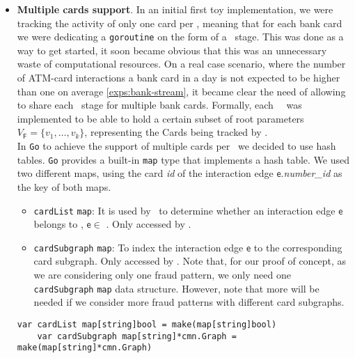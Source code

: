 \begin{itemize}
    \item \textbf{Multiple cards support}. In an initial first toy implementation, we were tracking the activity of only one card per \filter, meaning that for each bank card we were dedicating a \texttt{goroutine} on the form of a \filter\ stage. This was done as a way to get started, it soon became obvious that this was an unnecessary waste of computational resources. On a real case scenario, where the number of ATM-card interactions a bank card in a day is not expected to be higher than one on average \ref{exps:bank-stream}, it became clear the need of allowing to share each \filter\ stage for multiple bank cards. Formally, each \filter\ \F\ was implemented to be able to hold a certain subset of root parameters $V_{\mathsf{F}} = \{v_1,\ldots,v_k\}$, representing the Cards being tracked by \F.\\

    In \texttt{Go} to achieve the support of multiple cards per \filter\ we decided to use hash tables. \texttt{Go} provides a built-in \texttt{map} type that implements a hash table. We used two different maps, using the card \emph{id} of the interaction edge $\mathsf{e}$.\emph{number\_id} as the key of both maps.

    \begin{itemize}
        \item \texttt{cardList} \texttt{map}: It is used by \F\ to determine whether an interaction edge $\mathsf{e}$ belongs to \F, $\mathsf{e} \in$ \F. Only accessed by \F.
        \item \texttt{cardSubgraph} \texttt{map}: To index the interaction edge $\mathsf{e}$ to the corresponding card subgraph.
        Only accessed by \FW. Note that, for our proof of concept, as we are considering only one fraud pattern, we only need one \texttt{cardSubgraph} \texttt{map} data structure. However, note that more will be needed if we consider more fraud patterns with different card subgraphs.
    \end{itemize}

    \begin{center}
    \lstset{style=golangStyle}
    \begin{lstlisting}[caption={Hash tables \texttt{map} data structures on a \emph{Filter} \F\ stage in \texttt{Go}}]
    var cardList map[string]bool = make(map[string]bool)
    var cardSubgraph map[string]*cmn.Graph = make(map[string]*cmn.Graph)
    \end{lstlisting}
    \end{center}


\end{itemize}
